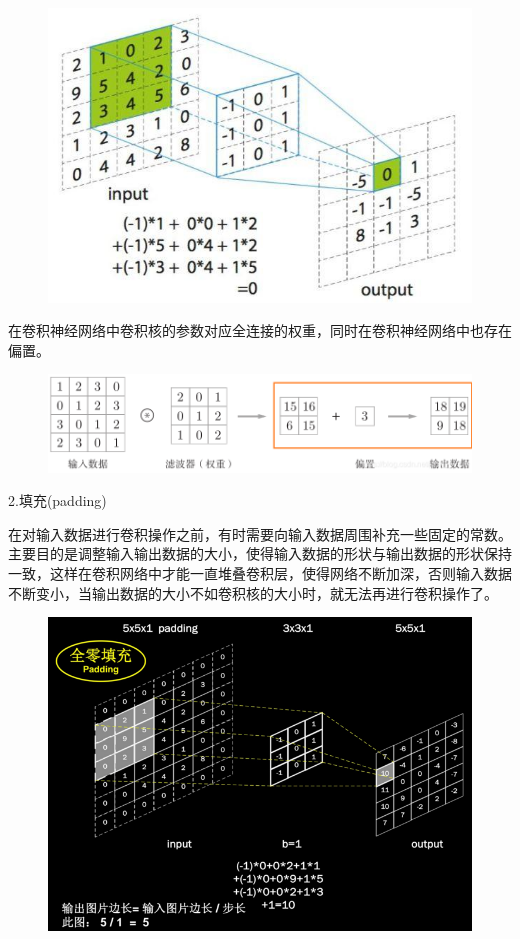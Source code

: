 \documentclass[openbib]{article}
\begin{document}
\begin{figure}[htbp]
	\centering
	\includegraphics[scale=0.3]{卷积运算.jpg}
\end{figure}

在卷积神经网络中卷积核的参数对应全连接的权重，同时在卷积神经网络中也存在偏置。
\begin{figure}[htbp]
	\centering
	\includegraphics[scale=0.4]{卷积运算的偏置}
\end{figure}

2.填充(padding)

在对输入数据进行卷积操作之前，有时需要向输入数据周围补充一些固定的常数。主要目的是调整输入输出数据的大小，使得输入数据的形状与输出数据的形状保持一致，这样在卷积网络中才能一直堆叠卷积层，使得网络不断加深，否则输入数据不断变小，当输出数据的大小不如卷积核的大小时，就无法再进行卷积操作了。

\begin{figure}[htbp]
	\centering
	\includegraphics[scale=0.4]{零填充}
\end{figure}
\end{document}
